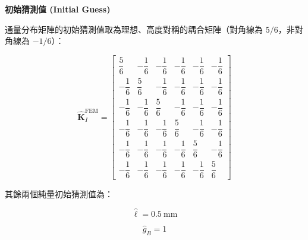 \documentclass[12pt]{article}
\newcommand{\zh}[1]{{\cjk #1}}
\begin{document}
\begin{center}
{\Large\bfseries \zh{初始猜測值} (Initial Guess)}
\end{center}

\vspace{1em}

\zh{通量分布矩陣的初始猜測值取為理想、高度對稱的耦合矩陣（對角線為} $5/6$\zh{，非對角線為} $-1/6$\zh{）：}

\[
\widehat{\mathbf{K}}_{I}^{\mathrm{FEM}}
=
\begin{bmatrix}
\dfrac{5}{6} & -\dfrac{1}{6} & -\dfrac{1}{6} & -\dfrac{1}{6} & -\dfrac{1}{6} & -\dfrac{1}{6}\\[2.2ex]
-\dfrac{1}{6} & \dfrac{5}{6} & -\dfrac{1}{6} & -\dfrac{1}{6} & -\dfrac{1}{6} & -\dfrac{1}{6}\\[2.2ex]
-\dfrac{1}{6} & -\dfrac{1}{6} & \dfrac{5}{6} & -\dfrac{1}{6} & -\dfrac{1}{6} & -\dfrac{1}{6}\\[2.2ex]
-\dfrac{1}{6} & -\dfrac{1}{6} & -\dfrac{1}{6} & \dfrac{5}{6} & -\dfrac{1}{6} & -\dfrac{1}{6}\\[2.2ex]
-\dfrac{1}{6} & -\dfrac{1}{6} & -\dfrac{1}{6} & -\dfrac{1}{6} & \dfrac{5}{6} & -\dfrac{1}{6}\\[2.2ex]
-\dfrac{1}{6} & -\dfrac{1}{6} & -\dfrac{1}{6} & -\dfrac{1}{6} & -\dfrac{1}{6} & \dfrac{5}{6}
\end{bmatrix}
\]

\vspace{1em}

\zh{其餘兩個純量初始猜測值為：}

\[
\widehat{\ell} = 0.5~\mathrm{mm}
\]

\[
\widehat{g}_{B} = 1
\]
\end{document}
